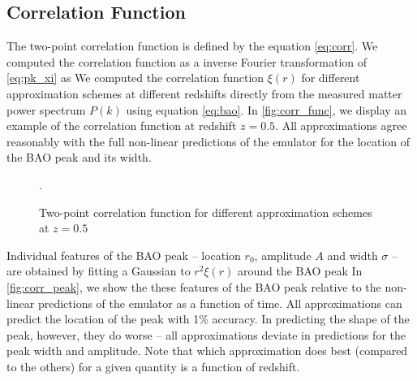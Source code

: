 \subsection{Correlation Function}
\label{sec:corr}
The two-point correlation function is defined by the equation \eqref{eq:corr}. We computed the correlation function as a inverse Fourier transformation of \eqref{eq:pk_xi} as
We computed the correlation function $\xi(r)$ for different approximation schemes at different redshifts directly from the measured matter power spectrum $P(k)$ using equation \eqref{eq:bao}. In \autoref{fig:corr_func}, we display an example of the correlation function at redshift $z=0.5$. All approximations agree reasonably with the full non-linear predictions of the emulator for the location of the BAO peak and its width.
\begin{figure}[bt]
\centering
	\begin{subfigure}{0.9\textwidth}
	\end{subfigure}
	\begin{subfigure}{0.9\textwidth}
		\centering
	\end{subfigure}
	\caption{Two-point correlation function for different approximation schemes at $z=0.5$}.
	\label{fig:corr_func}
\end{figure}

Individual features of the BAO peak -- location $r_0$, amplitude $A$ and width $\sigma$ -- are obtained by fitting a Gaussian to $r^2\xi(r)$ around the BAO peak
In \autoref{fig:corr_peak}, we show the these features of the BAO peak relative to the non-linear predictions of the emulator as a function of time. All approximations can predict the location of the peak with 1\% accuracy. In predicting the shape of the peak, however, they do worse -- all approximations deviate in predictions for the peak width and amplitude. Note that which approximation does best (compared to the others) for a given quantity is a function of redshift.


